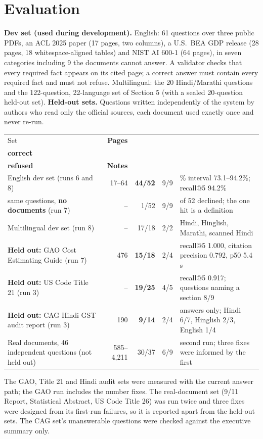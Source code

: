 \documentclass[10pt,a4paper]{article}
\newcommand{\note}[1]{{\raggedright\color{muted}\fontsize{8.3}{10}\selectfont #1\par}}
\begin{document}
\section{Evaluation}
\textbf{Dev set (used during development).} English: 61 questions over three public PDFs, an ACL 2025 paper (17 pages, two columns), a U.S.\ BEA GDP release
(28 pages, 18 whitespace-aligned tables) and NIST AI 600-1 (64 pages), in seven categories including 9 the documents cannot answer. A validator checks that every
required fact appears on its cited page; a correct answer must contain every required fact and must not refuse. Multilingual: the 20 Hindi/Marathi questions and the 122-question, 22-language set of Section 5 (with a sealed 20-question held-out set).
\textbf{Held-out sets.} Questions written independently of the system by authors who read only the official sources, each document used exactly once and never re-run.

\renewcommand{\arraystretch}{1.2}
{\fontsize{8.4}{10.2}\selectfont
\begin{tabularx}{\textwidth}{@{}>{\raggedright\arraybackslash}X r r r >{\raggedright\arraybackslash}p{48mm}@{}}
\toprule
Set & \textbf{Pages} & \shortstack[r]{\textbf{Answerable}\\\textbf{correct}} & \shortstack[r]{\textbf{Unanswerable}\\\textbf{refused}} & \textbf{Notes} \\ \midrule
English dev set (runs 6 and 8) & 17--64 & \textbf{44/52} & 9/9 & 95\% interval 73.1--94.2\%; recall@5 94.2\% \\
\quad same questions, \textbf{no documents} (run 7) & -- & 1/52 & 9/9 & 46 of 52 declined; the one hit is a definition \\
Multilingual dev set (run 8) & -- & 17/18 & 2/2 & Hindi, Hinglish, Marathi, scanned Hindi \\ \midrule
\textbf{Held out:} GAO Cost Estimating Guide (run 7) & 476 & \textbf{15/18} & 2/4 & recall@5 1.000, citation precision 0.792, p50 5.4 s \\
\textbf{Held out:} US Code Title 21 (run 3) & -- & \textbf{19/25} & 4/5 & recall@5 0.917; questions naming a section 8/9 \\
\textbf{Held out:} CAG Hindi GST audit report (run 3) & 190 & \textbf{9/14} & 2/4 & answers only; Hindi 6/7, Hinglish 2/3, English 1/4 \\ \midrule
Real documents, 46 independent questions (not held out) & 585--4,211 & 30/37 & 6/9 & second run; three fixes were informed by the first \\
\bottomrule
\end{tabularx}}
\note{The GAO, Title 21 and Hindi audit sets were measured with the current answer path; the GAO run includes the number fixes. The real-document set (9/11 Report, Statistical Abstract,
US Code Title 26) was run twice and three fixes were designed from its first-run failures, so it is reported apart from the held-out sets. The CAG set's unanswerable questions were checked against the executive summary only.}
\end{document}
